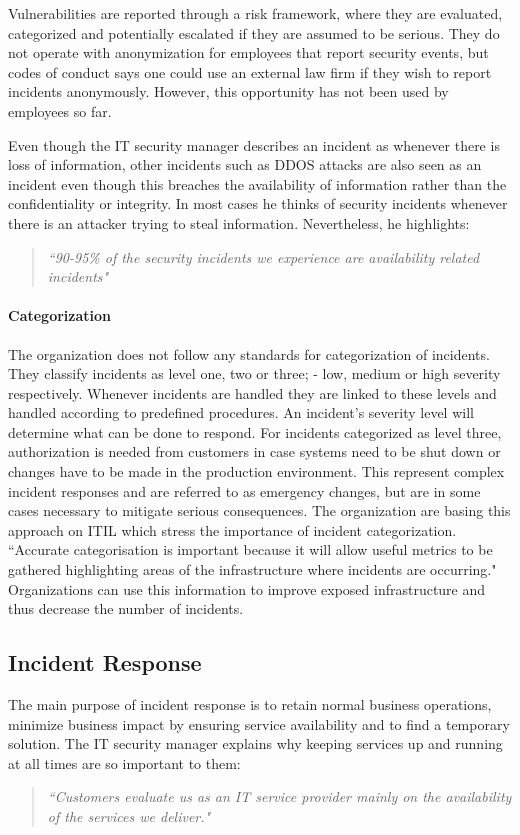 Vulnerabilities are reported through a risk framework, where they are evaluated, categorized and potentially escalated if they are assumed to be serious. They do not operate with anonymization for employees that report security events, but codes of conduct says one could use an external law firm if they wish to report incidents anonymously. However, this opportunity has not been used by employees so far. 

Even though the IT security manager describes an incident as whenever there is loss of information, other incidents such as DDOS attacks are also seen as an incident even though this breaches the availability of information rather than the confidentiality or integrity. In most cases he thinks of security incidents whenever there is an attacker trying to steal information. Nevertheless, he highlights:
\begin{quote}
\textit{``90-95\% of the security incidents we experience are availability related incidents"}
\end{quote}

\paragraph{Categorization}
The organization does not follow any standards for categorization of incidents. They classify incidents as level one, two or three; - low, medium or high severity respectively. Whenever incidents are handled they are linked to these levels and handled according to predefined procedures. An incident's severity level will determine what can be done to respond. For incidents categorized as level three, authorization is needed from customers in case systems need to be shut down or changes have to be made in the production environment. This represent complex incident responses and are referred to as emergency changes, but are in some cases necessary to mitigate serious consequences. The organization are basing this approach on ITIL which stress the importance of incident categorization. ``Accurate categorisation is important because it will allow useful metrics to be gathered highlighting areas of the infrastructure where incidents are occurring\cite{itilbok}." Organizations can use this information to improve exposed infrastructure and thus decrease the number of incidents.

\subsection{Incident Response}
The main purpose of incident response is to retain normal business operations, minimize business impact by ensuring service availability and  to find a temporary solution. The IT security manager explains why keeping services up and running at all times are so important to them:
\begin{quote}
\textit{``Customers evaluate us as an IT service provider mainly on the availability of the services we deliver."}
\end{quote}

